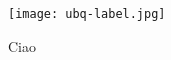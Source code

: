 %
%
%


\begin{figure}[h]
\centering
\begin{minipage}[t]{0.8\textwidth}
\centering
\texttt{[image: ubq-label.jpg]}

\caption{\small{Ciao}}

\label{fig:ubq}
\end{minipage} 
\end{figure}




